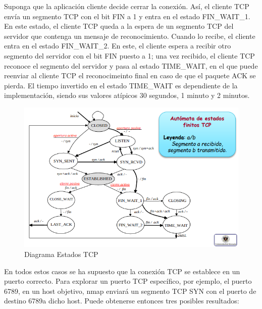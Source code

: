 \documentclass[a4paper,11pt]{article}
\begin{document}
Suponga que la aplicación cliente decide cerrar la conexión. Así, el cliente TCP envía un segmento TCP con el bit FIN  a 1 y entra en el estado FIN\_WAIT\_1. En este estado, el cliente TCP queda a la espera de un segmento TCP del servidor que contenga un mensaje de reconocimiento. Cuando lo recibe, el cliente entra en el estado FIN\_WAIT\_2. En este, el cliente espera a recibir otro segmento del servidor con el bit FIN puesto a 1; una vez recibido, el cliente TCP reconoce el segmento del servidor y pasa al estado TIME\_WAIT, en el que puede reenviar al cliente TCP el reconocimeinto final en caso de que el paquete ACK se pierda. El tiempo invertido en el estado TIME\_WAIT es dependiente de la implementación, siendo sus valores atípicos 30 segundos, 1 minuto y 2 minutos.

\begin{figure}[h]
\centering
\caption{Diagrama Estados TCP}
\includegraphics[scale=1,width=1\textwidth]{diagrama_tcp.png}
\end{figure}

En todos estos casos se ha supuesto que la conexión TCP se establece en un puerto correcto. Para explorar un puerto TCP específico, por ejemplo, el puerto 6789, en un host objetivo, nmap enviará un segmento TCP SYN con el puerto de destino 6789a dicho host. Puede obtenerse entonces tres posibles resultados:
\end{document}

